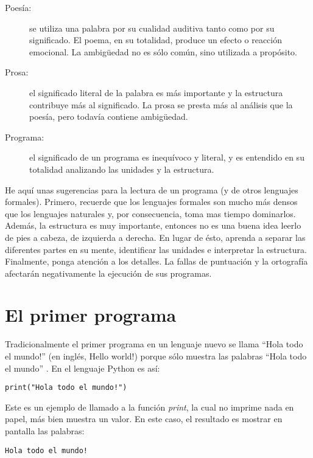  
\begin{description}
\item [{Poesía:}] se utiliza una palabra por su cualidad auditiva tanto
como por su significado. El poema, en su totalidad, produce un efecto
o reacción emocional. La ambigüedad no es sólo común, sino utilizada
a propósito.
\item [{Prosa:}] el significado literal de la palabra es más importante
y la estructura contribuye más al significado. La prosa se presta
más al análisis que la poesía, pero todavía contiene ambigüedad.
\item [{Programa:}] el significado de un programa es inequívoco y literal,
y es entendido en su totalidad analizando las unidades y la estructura.
\end{description}
He aquí unas sugerencias para la lectura de un programa (y de otros
lenguajes formales). Primero, recuerde que los lenguajes formales
son mucho más densos que los lenguajes naturales y, por consecuencia,
toma mas tiempo dominarlos. Además, la estructura es muy importante,
entonces no es una buena idea leerlo de pies a cabeza, de izquierda
a derecha. En lugar de ésto, aprenda a separar las diferentes partes
en su mente, identificar las unidades e interpretar la estructura.
Finalmente, ponga atención a los detalles. La fallas de puntuación
y la ortografía afectarán negativamente la ejecución de sus programas.

\section{El primer programa}

\label{hello} \label{hello world}

Tradicionalmente el primer programa en un lenguaje nuevo se llama
``Hola todo el mundo!'' (en inglés, Hello world!) porque sólo muestra
las palabras ``Hola todo el mundo'' . En el lenguaje Python es así:

\begin{lstlisting}
print("Hola todo el mundo!")
\end{lstlisting}

Este es un ejemplo de llamado a la función {\em print}, la cual
no imprime nada en papel, más bien muestra un valor. En este caso,
el resultado es mostrar en pantalla las palabras:

\begin{lstlisting}
Hola todo el mundo!
\end{lstlisting}

